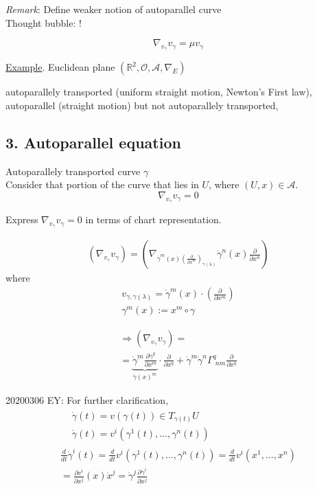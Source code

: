 \documentclass[10pt]{amsart}
\begin{document}
\begin{multicols*}{2}
\emph{Remark}: Define weaker notion of autoparallel curve \\
Thought bubble: !

\[
\nabla_{v_{\gamma}} v_{\gamma} = \mu v_{\gamma} 
\]

\underline{Example}. Euclidean plane $(\mathbb{R}^2, \mathcal{O}, \mathcal{A}, \nabla_E)$

autoparallely transported (uniform straight motion, Newton's First law), autoparallel (straight motion) but not autoparallely transported, 

\subsection*{3. Autoparallel equation}

Autoparallely transported curve $\gamma$ \\
Consider that portion of the curve that lies in $U$, where $(U, x) \in \mathcal{A}$.
\[
\nabla_{v_{\gamma}} v_{\gamma} = 0 
\]

Express $\nabla_{v_{\gamma}} v_{\gamma} = 0$ in terms of chart representation.

\[
\begin{gathered}
 (\nabla_{v_{\gamma}} v_{\gamma}) = \left( \nabla_{\dot{\gamma}^m(x)\left( \frac{\partial}{\partial x^m} \right)_{\gamma(\lambda)} } \dot{\gamma}^n(x) \frac{\partial}{\partial x^n} \right) 
\end{gathered}
\]
where
\[
\begin{gathered} 
	v_{\gamma, \gamma(\lambda)} = \dot{\gamma}^m(x) \cdot \left( \frac{\partial}{\partial x^m} \right) \\ 
	\gamma^m(x) := x^m \circ \gamma 
\end{gathered} 
\]

\[
\begin{gathered}
\Longrightarrow (\nabla_{v_{\gamma}} v_{\gamma}) =  \\
 = \underbrace{ \dot{\gamma}^m \frac{\partial \dot{\gamma}^q }{ \partial x^m} }_{\ddot{\gamma}(x)^m } \cdot \frac{\partial }{ \partial x^q} + \dot{\gamma}^m \dot{\gamma}^n \Gamma^q_{ \, \, nm} \frac{\partial}{\partial x^q}
\end{gathered}
\]

20200306 EY: For further clarification, 
\[
\begin{gathered} 
\begin{aligned} 
 	& \dot{\gamma}(t) = v(\gamma(t)) \in T_{\gamma(t)}U \\ 
	& \dot{\gamma}(t) = v^i(\gamma^1(t), \dots, \gamma^n(t))
\end{aligned} \\ 
 \frac{d}{dt} \dot{\gamma}^i(t) = \frac{d}{dt} v^i(\gamma^1(t), \dots , \gamma^n(t)) = \frac{d}{dt} v^i(x^1 , \dots , x^n) \\
 = \frac{\partial v^i}{\partial x^j}(x) \dot{x}^j = \dot{\gamma}^j \frac{\partial \dot{\gamma}^i}{\partial x^j}
\end{gathered} 
\]


\end{multicols*}
\end{document}
